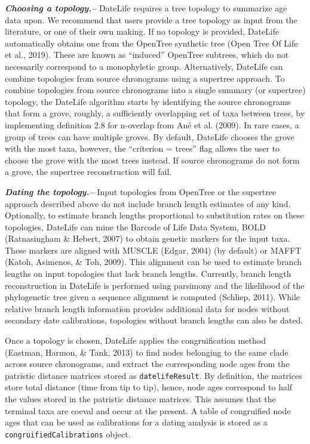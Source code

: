 \documentclass[
  man]{apa6}
\begin{document}
\emph{\textbf{Choosing a topology.--}}
DateLife requires a tree topology to summarize age data upon.
We recommend that users provide a tree topology as input from the literature, or one of their own making. If no topology is provided, DateLife automatically obtains one from the OpenTree synthetic tree (Open Tree Of Life et al., 2019). These are known as ``induced'' OpenTree subtrees, which do not necessarily correspond to a monophyletic group.
Alternatively, DateLife can combine topologies from source chronograms using a supertree approach.
To combine topologies from source chronograms into a single summary (or supertree) topology, the DateLife algorithm starts by identifying the source chronograms that form a grove, roughly, a sufficiently overlapping set of taxa between trees, by implementing definition 2.8 for n-overlap from Ané et al. (2009). In rare cases, a group of trees can have multiple groves. By default, DateLife chooses the grove with the most taxa, however, the ``criterion = trees'' flag allows the user to choose the grove with the most trees instead.
If source chronograms do not form a grove, the supertree reconstruction will fail.

\emph{\textbf{Dating the topology.--}}
Input topologies from OpenTree or the supertree approach described above do not include branch length estimates of any kind.
Optionally, to estimate branch lengths proportional to substitution rates on these topologies, DateLife can mine the Barcode of Life Data System, BOLD (Ratnasingham \& Hebert, 2007) to obtain genetic markers for the input taxa.
These markers are aligned with MUSCLE (Edgar, 2004) (by default) or MAFFT (Katoh, Asimenos, \& Toh, 2009).
This alignment can be used to estimate branch lengths on input topologies that lack branch lengths.
Currently, branch length reconstruction in DateLife is performed using parsimony and the likelihood of the phylogenetic tree given a sequence alignment is computed (Schliep, 2011).
While relative branch length information provides additional data for nodes without secondary date calibrations, topologies without branch lengths can also be dated.

Once a topology is chosen, DateLife applies the congruification method (Eastman, Harmon, \& Tank, 2013) to find nodes belonging to the same clade across source chronograms, and extract the corresponding node ages from the patristic distance matrices stored as \texttt{datelifeResult}. By definition, the matrices store total distance (time from tip to tip), hence, node ages correspond to half the values stored in the patristic distance matrices.
This assumes that the terminal taxa are coeval and occur at the present.
A table of congruified node ages that can be used as calibrations for a dating analysis is stored as a \texttt{congruifiedCalibrations} object.
\end{document}
